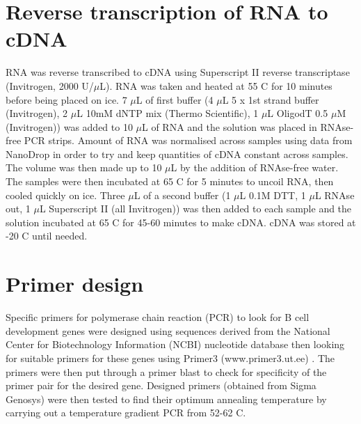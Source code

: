 \section{Reverse transcription of RNA to cDNA}

RNA was reverse transcribed to cDNA using Superscript II reverse transcriptase (Invitrogen, 2000 U/$\mu$L).
RNA was taken and heated at 55 \textdegree C for 10 minutes before being placed on ice.
7 $\mu$L of first buffer (4 $\mu$L 5 x 1st strand buffer (Invitrogen), 2 $\mu$L 10mM dNTP mix (Thermo Scientific), 1 $\mu$L OligodT 0.5 $\mu$M (Invitrogen)) was added to 10 $\mu$L of RNA and the solution was placed in RNAse-free PCR strips.
Amount of RNA was normalised across samples using data from NanoDrop in order to try and keep quantities of cDNA constant across samples.
The volume was then made up to 10 $\mu$L by the addition of RNAse-free water.
The samples were then incubated at 65 \textdegree C for 5 minutes to uncoil RNA, then cooled quickly on ice.
Three $\mu$L of a second buffer (1 $\mu$L 0.1M DTT, 1 $\mu$L RNAse out, 1 $\mu$L Superscript II (all Invitrogen)) was then added to each sample and the solution incubated at 65 \textdegree C for 45-60 minutes to make cDNA.
cDNA was stored at -20 \textdegree C until needed.

\section{Primer design}

Specific primers for polymerase chain reaction (PCR) to look for B cell development genes were designed using sequences derived from the National Center for Biotechnology Information (NCBI) nucleotide database \citep{NCBIdatabase} then looking for suitable primers for these genes using Primer3 (www.primer3.ut.ee) \citep{Primer3}.
The primers were then put through a primer blast \citep{Primerblast} to check for specificity of the primer pair for the desired gene.
Designed primers (obtained from Sigma Genosys) were then tested to find their optimum annealing temperature by carrying out a temperature gradient PCR from 52-62 \textdegree C.

